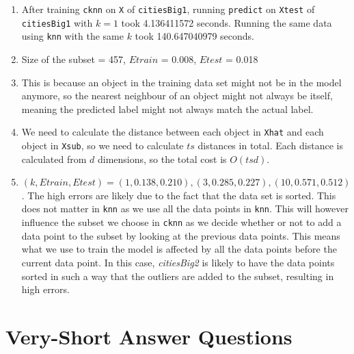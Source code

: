 \documentclass{article}
\def\enum#1{\begin{enumerate}#1\end{enumerate}}
\begin{document}
\enum{
	\item After training \texttt{cknn} on \texttt{X} of \texttt{citiesBig1}, running \texttt{predict} on \texttt{Xtest} of \texttt{citiesBig1} with $k = 1$ took 4.136411572 seconds. Running the same data using \texttt{knn} with the same $k$ took 140.647040979 seconds.
	\item Size of the subset = 457, $Etrain$ = 0.008, $Etest$ = 0.018
	\item This is because an object in the training data set might not be in the model anymore, so the nearest neighbour of an object might not always be itself, meaning the predicted label might not always match the actual label.
	\item We need to calculate the distance between each object in \texttt{Xhat} and each object in \texttt{Xsub}, so we need to calculate $ts$ distances in total. Each distance is calculated from $d$ dimensions, so the total cost is $O(tsd)$.
    \item $(k, Etrain, Etest) = (1, 0.138, 0.210), (3, 0.285, 0.227), (10, 0.571, 0.512)$. The high errors are likely due to the fact that the data set is sorted. This does not matter in \texttt{knn} as we use all the data points in \texttt{knn}. This will however influence the subset we choose in \texttt{cknn} as we decide whether or not to add a data point to the subset by looking at the previous data points. This means what we use to train the model is affected by all the data points before the current data point. In this case, \textit{citiesBig2} is likely to have the data points sorted in such a way that the outliers are added to the subset, resulting in high errors.
}

\section{Very-Short Answer Questions}
\end{document}

